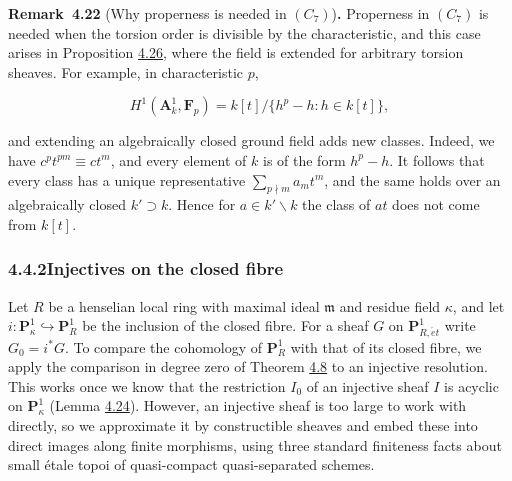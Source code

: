 \documentclass[11pt]{article}
\newenvironment{bpstatement}[2]{\par\addvspace{0.6\baselineskip}\noindent\textbf{#1}#2\textbf{.}\enspace\ignorespaces}
  {\par\addvspace{0.4\baselineskip}}
\begin{document}
\label{bp62}%
\begin{bpstatement}{Remark~4.22}{ (Why properness is needed in $(C_7)$)}
Properness in \((C_7)\) is needed when the torsion order is divisible by the characteristic, and this case arises in Proposition \hyperref[bp76]{4.26}, where the field is extended for arbitrary torsion sheaves. For example, in characteristic \(p\),

\[
H^1(\mathbf A^1_k,\mathbf F_p)
=k[t]/\{h^p-h:h\in k[t]\},
\]

and extending an algebraically closed ground field adds new classes. Indeed, we have \(c^pt^{pm}\equiv ct^m\), and every element of \(k\) is of the form \(h^p-h\). It follows that every class has a unique representative \(\sum_{p\nmid m}a_mt^m\), and the same holds over an algebraically closed \(k'\supset k\). Hence for \(a\in k'\smallsetminus k\) the class of \(at\) does not come from \(k[t]\).
\end{bpstatement}


\subsubsection*{\texorpdfstring{4.4.2\quad Injectives on the closed fibre}{4.4.2 Injectives on the closed fibre}}
\label{bp63}%
\label{bp64}%
Let \(R\) be a henselian local ring with maximal ideal \(\mathfrak m\) and residue field \(\kappa\), and let \(i:\mathbf P^1_\kappa\hookrightarrow\mathbf P^1_R\) be the inclusion of the closed fibre. For a sheaf \(G\) on \(\mathbf P^1_{R,\acute{e}t}\) write \(G_0=i^*G\). To compare the cohomology of \(\mathbf P^1_R\) with that of its closed fibre, we apply the comparison in degree zero of Theorem \hyperref[bp24]{4.8} to an injective resolution. This works once we know that the restriction \(I_0\) of an injective sheaf \(I\) is acyclic on \(\mathbf P^1_\kappa\) (Lemma \hyperref[bp68]{4.24}). However, an injective sheaf is too large to work with directly, so we approximate it by constructible sheaves and embed these into direct images along finite morphisms, using three standard finiteness facts about small étale topoi of quasi-compact quasi-separated schemes.
\end{document}
